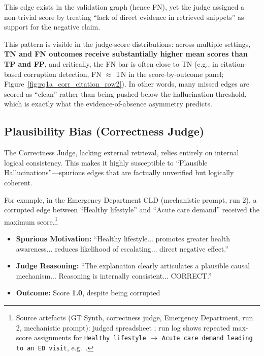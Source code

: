 This edge exists in the validation graph (hence FN), yet the judge assigned a non-trivial score by treating ``lack of direct evidence in retrieved snippets'' as support for the negative claim.

This pattern is visible in the judge-score distributions: across multiple settings, \textbf{TN and FN outcomes receive substantially higher mean scores than TP and FP}, and critically, the FN bar is often close to TN (e.g., in citation-based corruption detection, FN $\approx$ TN in the score-by-outcome panel; Figure~\ref{fig:rq1a_corr_citation_row2}). In other words, many missed edges are scored as ``clean'' rather than being pushed below the hallucination threshold, which is exactly what the evidence-of-absence asymmetry predicts.

\subsection{Plausibility Bias (Correctness Judge)}

The Correctness Judge, lacking external retrieval, relies entirely on internal logical consistency. This makes it highly susceptible to ``Plausible Hallucinations''---spurious edges that are factually unverified but logically coherent.

For example, in the Emergency Department CLD (mechanistic prompt, run 2), a corrupted edge between ``Healthy lifestyle'' and ``Acute care demand'' received the maximum score.\footnote{Source artefacts (GT Synth, correctness judge, Emergency Department, run 2, mechanistic prompt): judged spreadsheet ; run log shows repeated max-score assignments for \texttt{Healthy lifestyle} $\rightarrow$ \texttt{Acute care demand leading to an ED visit}, e.g.\ .}%
\begin{itemize}[noitemsep]
    \item \textbf{Spurious Motivation:} ``Healthy lifestyle... promotes greater health awareness... reduces likelihood of escalating... direct negative effect.''
    \item \textbf{Judge Reasoning:} ``The explanation clearly articulates a plausible causal mechanism... Reasoning is internally consistent... CORRECT.''
    \item \textbf{Outcome:} Score \textbf{1.0}, despite being corrupted
\end{itemize}

